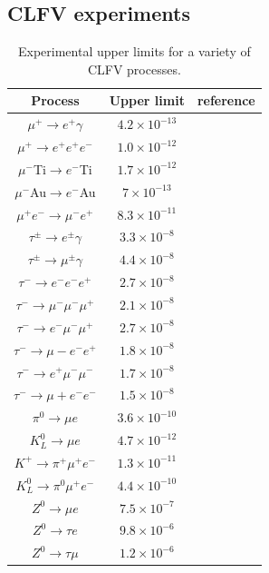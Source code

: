 \begin{refsection}
    \subsection{CLFV experiments}
        \begin{table}[!h]
\centering
\begin{tabular}{c|c|c}
\hline
Process & Upper limit & reference\\
\hline
\hline
$\mu^+\rightarrow e^+\gamma$ & $4.2\times 10^{-13}$ & \cite{MEG}\\
$\mu^+\rightarrow e^+e^+e^-$ & $1.0\times 10^{-12}$ & \cite{SINDRUM}\\
$\mu^-$Ti$\rightarrow e^-$Ti  & $1.7\times 10^{-12}$ & \cite{SINDRUM}\\
$\mu^-$Au$\rightarrow e^-$Au  & $7\times 10^{-13}$   & \cite{Bertl}\\
$\mu^+e^-\rightarrow \mu^-e^+$ & $8.3\times 10^{-11}$ & \cite{Willmann}\\
$\tau^\pm\rightarrow e^\pm\gamma$ & $3.3\times 10^{-8}$ & \cite{Aubert}\\
$\tau^\pm\rightarrow \mu^\pm\gamma$ & $4.4\times 10^{-8}$ & \cite{Aubert}\\
$\tau^-\rightarrow e^-e^-e^+$ & $2.7\times 10^{-8}$ & \cite{Hayasaka}\\
$\tau^-\rightarrow \mu^-\mu^-\mu^+$ & $2.1\times 10^{-8}$ & \cite{Hayasaka}\\
$\tau^-\rightarrow e^-\mu^-\mu^+$ & $2.7\times 10^{-8}$ & \cite{Hayasaka}\\
$\tau^-\rightarrow \mu-e^-e^+$ & $1.8\times 10^{-8}$ & \cite{Hayasaka}\\
$\tau^-\rightarrow e^+\mu^-\mu^-$ & $1.7\times 10^{-8}$ & \cite{Hayasaka}\\
$\tau^-\rightarrow \mu+e^-e^-$ & $1.5\times 10^{-8}$ & \cite{Hayasaka}\\
$\pi^0\rightarrow \mu e$ & $3.6\times 10^{-10}$ & \cite{Abouzaid}\\
$K^0_L\rightarrow \mu e$ & $4.7\times 10^{-12}$ & \cite{Ambrose}\\
$K^+\rightarrow \pi^+\mu^+e^-$ & $1.3\times 10^{-11}$ & \cite{Sher}\\
$K^0_L\rightarrow \pi^0\mu^+e^-$ & $4.4\times 10^{-10}$ & \cite{Abouzaid}\\
$Z^0\rightarrow \mu e$ & $7.5\times10^{-7}$& \cite{Aad}\\
$Z^0\rightarrow \tau e$ & $9.8\times10^{-6}$& \cite{Akers} \\
$Z^0\rightarrow \tau \mu$ & $1.2\times10^{-6}$& \cite{Akers}\\
\hline
\end{tabular}
\caption[Limits for CLFV processes]{Experimental upper limits for a variety of CLFV processes.}
\label{T_CLFV}
\end{table}



\end{refsection}

